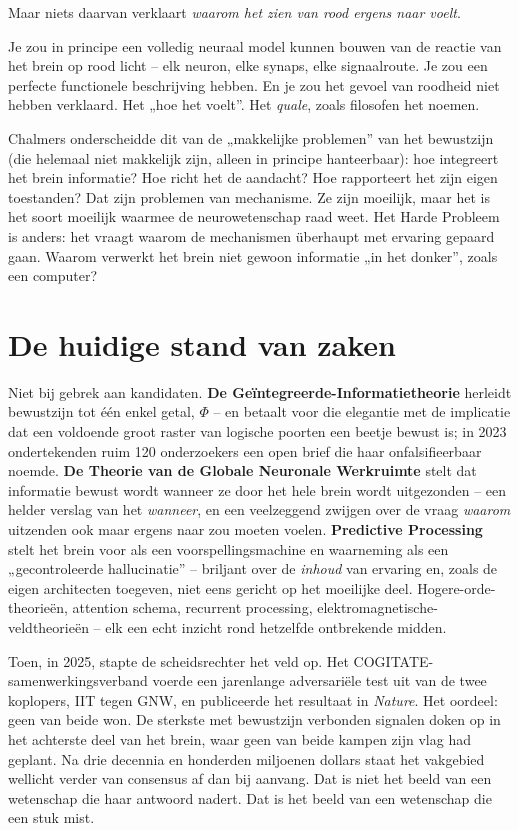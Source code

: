 \documentclass[11pt, twoside, openright]{book}
\begin{document}
Maar niets daarvan verklaart \textit{waarom het zien van rood ergens naar voelt}.

Je zou in principe een volledig neuraal model kunnen bouwen van de reactie van het brein op rood licht -- elk neuron, elke synaps, elke signaalroute. Je zou een perfecte functionele beschrijving hebben. En je zou het gevoel van roodheid niet hebben verklaard. Het „hoe het voelt”. Het \textit{quale}, zoals filosofen het noemen.

Chalmers onderscheidde dit van de „makkelijke problemen” van het bewustzijn (die helemaal niet makkelijk zijn, alleen in principe hanteerbaar): hoe integreert het brein informatie? Hoe richt het de aandacht? Hoe rapporteert het zijn eigen toestanden? Dat zijn problemen van mechanisme. Ze zijn moeilijk, maar het is het soort moeilijk waarmee de neurowetenschap raad weet. Het Harde Probleem is anders: het vraagt waarom de mechanismen überhaupt met ervaring gepaard gaan. Waarom verwerkt het brein niet gewoon informatie „in het donker”, zoals een computer?

\section*{De huidige stand van zaken}

Niet bij gebrek aan kandidaten. \textbf{De Geïntegreerde-Informatietheorie} herleidt bewustzijn tot één enkel getal, $\Phi$ -- en betaalt voor die elegantie met de implicatie dat een voldoende groot raster van logische poorten een beetje bewust is; in 2023 ondertekenden ruim 120 onderzoekers een open brief die haar onfalsifieerbaar noemde. \textbf{De Theorie van de Globale Neuronale Werkruimte} stelt dat informatie bewust wordt wanneer ze door het hele brein wordt uitgezonden -- een helder verslag van het \textit{wanneer}, en een veelzeggend zwijgen over de vraag \textit{waarom} uitzenden ook maar ergens naar zou moeten voelen. \textbf{Predictive Processing} stelt het brein voor als een voorspellingsmachine en waarneming als een „gecontroleerde hallucinatie” -- briljant over de \textit{inhoud} van ervaring en, zoals de eigen architecten toegeven, niet eens gericht op het moeilijke deel. Hogere-orde-theorieën, attention schema, recurrent processing, elektromagnetische-veldtheorieën -- elk een echt inzicht rond hetzelfde ontbrekende midden.

Toen, in 2025, stapte de scheidsrechter het veld op. Het COGITATE-samenwerkingsverband voerde een jarenlange adversariële test uit van de twee koplopers, IIT tegen GNW, en publiceerde het resultaat in \textit{Nature}. Het oordeel: geen van beide won. De sterkste met bewustzijn verbonden signalen doken op in het achterste deel van het brein, waar geen van beide kampen zijn vlag had geplant. Na drie decennia en honderden miljoenen dollars staat het vakgebied wellicht verder van consensus af dan bij aanvang. Dat is niet het beeld van een wetenschap die haar antwoord nadert. Dat is het beeld van een wetenschap die een stuk mist.
\end{document}
